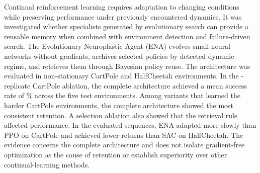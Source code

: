 Continual reinforcement learning requires adaptation to changing conditions while preserving performance under previously encountered dynamics. It was investigated whether specialists generated by evolutionary search can provide a reusable memory when combined with environment detection and failure-driven search. The Evolutionary Neuroplastic Agent (ENA) evolves small neural networks without gradients, archives selected policies by detected dynamic regime, and retrieves them through Bayesian policy reuse. The architecture was evaluated in non-stationary CartPole and HalfCheetah environments. In the -replicate CartPole ablation, the complete architecture achieved a mean success rate of \% across the five test environments. Among variants that learned the harder CartPole environments, the complete architecture showed the most consistent retention. A selection ablation also showed that the retrieval rule affected performance. In the evaluated sequences, ENA adapted more slowly than PPO on CartPole and achieved lower returns than SAC on HalfCheetah. The evidence concerns the complete architecture and does not isolate gradient-free optimization as the cause of retention or establish superiority over other continual-learning methods.
